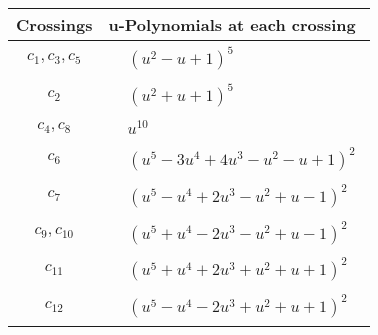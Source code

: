 \documentclass[1p]{elsarticle_modified}
\theoremstyle{definition}
\begin{document}
\begin{tabular}{m{50pt}|m{274pt}}
Crossings & \hspace{64pt}u-Polynomials at each crossing \\
\hline $$\begin{aligned}c_{1},c_{3},c_{5}\end{aligned}$$&$\begin{aligned}
&(u^2- u+1)^5
\end{aligned}$\\
\hline $$\begin{aligned}c_{2}\end{aligned}$$&$\begin{aligned}
&(u^2+u+1)^5
\end{aligned}$\\
\hline $$\begin{aligned}c_{4},c_{8}\end{aligned}$$&$\begin{aligned}
&u^{10}
\end{aligned}$\\
\hline $$\begin{aligned}c_{6}\end{aligned}$$&$\begin{aligned}
&(u^5-3 u^4+4 u^3- u^2- u+1)^2
\end{aligned}$\\
\hline $$\begin{aligned}c_{7}\end{aligned}$$&$\begin{aligned}
&(u^5- u^4+2 u^3- u^2+u-1)^2
\end{aligned}$\\
\hline $$\begin{aligned}c_{9},c_{10}\end{aligned}$$&$\begin{aligned}
&(u^5+u^4-2 u^3- u^2+u-1)^2
\end{aligned}$\\
\hline $$\begin{aligned}c_{11}\end{aligned}$$&$\begin{aligned}
&(u^5+u^4+2 u^3+u^2+u+1)^2
\end{aligned}$\\
\hline $$\begin{aligned}c_{12}\end{aligned}$$&$\begin{aligned}
&(u^5- u^4-2 u^3+u^2+u+1)^2
\end{aligned}$\\
\hline
\end{tabular}\\~\\
\end{document}
